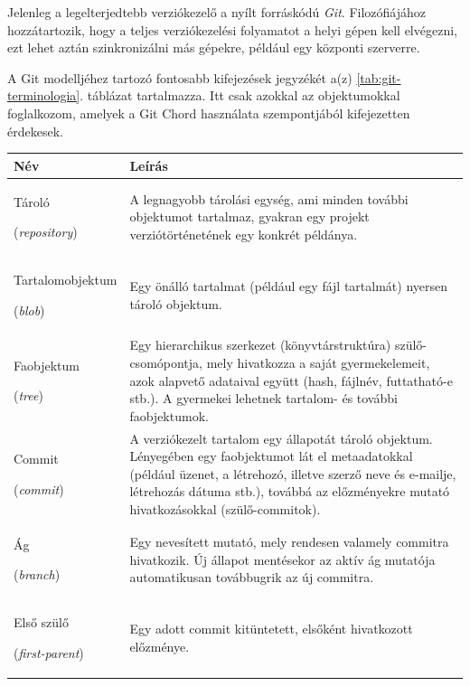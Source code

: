\documentclass[
]{elteikthesis}[2025/03/25]
\begin{document}
Jelenleg a legelterjedtebb verziókezelő a nyílt forráskódú \textit{Git}.
Filozófiájához hozzátartozik,
hogy a teljes verziókezelési folyamatot a helyi gépen kell elvégezni,
ezt lehet aztán szinkronizálni más gépekre, például egy központi szerverre.

A Git modelljéhez tartozó fontosabb kifejezések jegyzékét a(z) \ref{tab:git-terminologia}. táblázat tartalmazza.
Itt csak azokkal az objektumokkal foglalkozom,
amelyek a Git Chord használata szempontjából kifejezetten érdekesek.

\begin{table}[p]
\captionsetup{justification=justified, singlelinecheck=false}
\centering
\setlength{\tabcolsep}{7pt}
\renewcommand{\arraystretch}{1.08}
\begin{tabularx}{\textwidth}{L{3.35cm}@{\hspace{6pt}}Y}
\toprule
\textbf{Név} & \textbf{Leírás} \\
\midrule
Tároló \par(\textit{repository}) &
A legnagyobb tárolási egység, ami minden további objektumot tartalmaz,
gyakran egy projekt verziótörténetének egy konkrét példánya. \\
\addlinespace
Tartalomobjektum \par(\textit{blob}) &
Egy önálló tartalmat (például egy fájl tartalmát) nyersen tároló objektum. \\
\addlinespace
Faobjektum \par(\textit{tree}) &
Egy hierarchikus szerkezet (könyvtárstruktúra) szülő-\allowbreak csomópontja,
mely hivatkozza a saját gyermekelemeit, azok alapvető adataival együtt
(hash, fájlnév, futtatható-e stb.).
A gyermekei lehetnek tartalom- és további faobjektumok. \\
\addlinespace
Commit \par(\textit{commit}) &
A verziókezelt tartalom egy állapotát tároló objektum.
Lényegében egy faobjektumot lát el metaadatokkal
(például üzenet, a létrehozó, illetve szerző neve és e-mailje, létrehozás dátuma stb.),
továbbá az előzményekre mutató hivatkozásokkal (szülő-commitok). \\
\addlinespace
Ág \par(\textit{branch}) &
Egy nevesített mutató, mely rendesen valamely commitra hivatkozik.
Új állapot mentésekor az aktív ág mutatója automatikusan továbbugrik az új commitra. \\
\addlinespace
Első szülő \par(\textit{first-parent}) &
Egy adott commit kitüntetett, elsőként hivatkozott előzménye. \\

\end{tabularx}
\end{table}
\end{document}
